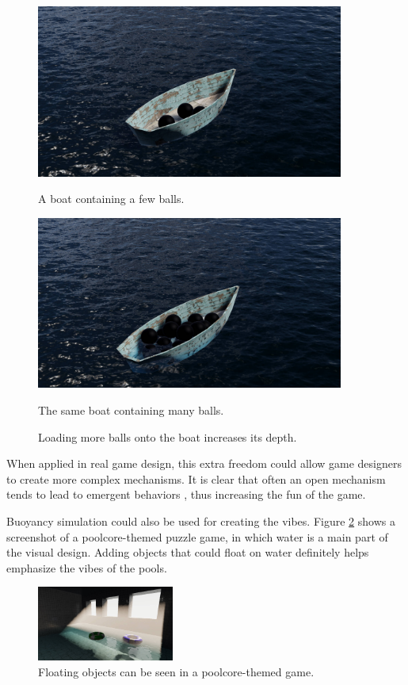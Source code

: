 \begin{figure}[htb]
	\centering
	\begin{subcaptionblock}{0.46\textwidth}
		\centering
		\includegraphics[width=0.9\textwidth]{figures/light-boat.jpg}
		\caption{A boat containing a few balls.}
	\end{subcaptionblock}
	\begin{subcaptionblock}{0.46\textwidth}
		\centering
		\includegraphics[width=0.9\textwidth]{figures/heavy-boat.jpg}
		\caption{The same boat containing many balls.}
	\end{subcaptionblock}
	\caption{Loading more balls onto the boat increases its depth.}
	\label{boat-sample}
\end{figure}

When applied in real game design, this extra freedom could allow game designers to create more complex mechanisms.
It is clear that often an open mechanism tends to lead to emergent behaviors \cite{sweetser2006emergent}, thus increasing the fun of the game.

Buoyancy simulation could also be used for creating the vibes.
Figure \ref{floating-donut-in-game} shows a screenshot of a poolcore-themed puzzle game, in which water is a main part of the visual design.
Adding objects that could float on water definitely helps emphasize the vibes of the pools.

\begin{figure}[ht]
	\centering
	\includegraphics[width=0.4\textwidth]{figures/floating-donut-in-game.jpg}
	\caption{Floating objects can be seen in a poolcore-themed game.}
	\label{floating-donut-in-game}
\end{figure}